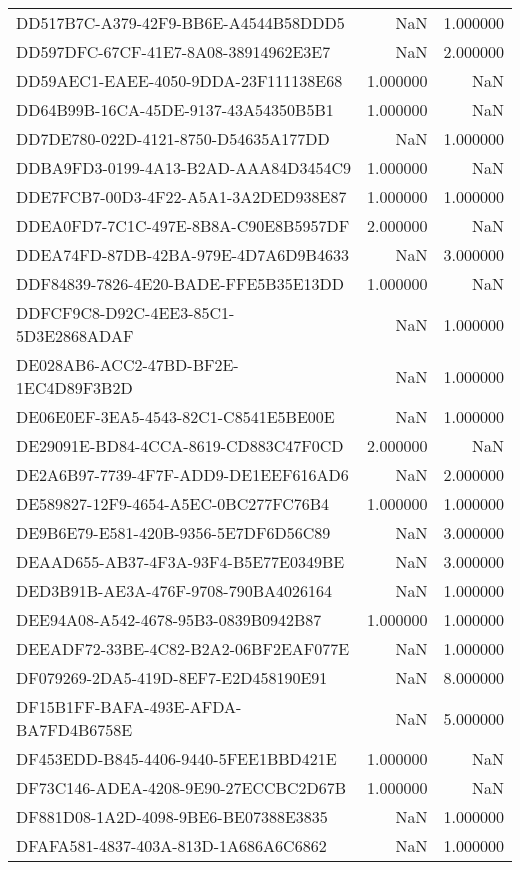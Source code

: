 \begin{tabular}{lrr}
DD517B7C-A379-42F9-BB6E-A4544B58DDD5 & NaN & 1.000000 \\
DD597DFC-67CF-41E7-8A08-38914962E3E7 & NaN & 2.000000 \\
DD59AEC1-EAEE-4050-9DDA-23F111138E68 & 1.000000 & NaN \\
DD64B99B-16CA-45DE-9137-43A54350B5B1 & 1.000000 & NaN \\
DD7DE780-022D-4121-8750-D54635A177DD & NaN & 1.000000 \\
DDBA9FD3-0199-4A13-B2AD-AAA84D3454C9 & 1.000000 & NaN \\
DDE7FCB7-00D3-4F22-A5A1-3A2DED938E87 & 1.000000 & 1.000000 \\
DDEA0FD7-7C1C-497E-8B8A-C90E8B5957DF & 2.000000 & NaN \\
DDEA74FD-87DB-42BA-979E-4D7A6D9B4633 & NaN & 3.000000 \\
DDF84839-7826-4E20-BADE-FFE5B35E13DD & 1.000000 & NaN \\
DDFCF9C8-D92C-4EE3-85C1-5D3E2868ADAF & NaN & 1.000000 \\
DE028AB6-ACC2-47BD-BF2E-1EC4D89F3B2D & NaN & 1.000000 \\
DE06E0EF-3EA5-4543-82C1-C8541E5BE00E & NaN & 1.000000 \\
DE29091E-BD84-4CCA-8619-CD883C47F0CD & 2.000000 & NaN \\
DE2A6B97-7739-4F7F-ADD9-DE1EEF616AD6 & NaN & 2.000000 \\
DE589827-12F9-4654-A5EC-0BC277FC76B4 & 1.000000 & 1.000000 \\
DE9B6E79-E581-420B-9356-5E7DF6D56C89 & NaN & 3.000000 \\
DEAAD655-AB37-4F3A-93F4-B5E77E0349BE & NaN & 3.000000 \\
DED3B91B-AE3A-476F-9708-790BA4026164 & NaN & 1.000000 \\
DEE94A08-A542-4678-95B3-0839B0942B87 & 1.000000 & 1.000000 \\
DEEADF72-33BE-4C82-B2A2-06BF2EAF077E & NaN & 1.000000 \\
DF079269-2DA5-419D-8EF7-E2D458190E91 & NaN & 8.000000 \\
DF15B1FF-BAFA-493E-AFDA-BA7FD4B6758E & NaN & 5.000000 \\
DF453EDD-B845-4406-9440-5FEE1BBD421E & 1.000000 & NaN \\
DF73C146-ADEA-4208-9E90-27ECCBC2D67B & 1.000000 & NaN \\
DF881D08-1A2D-4098-9BE6-BE07388E3835 & NaN & 1.000000 \\
DFAFA581-4837-403A-813D-1A686A6C6862 & NaN & 1.000000 \\

\end{tabular}
